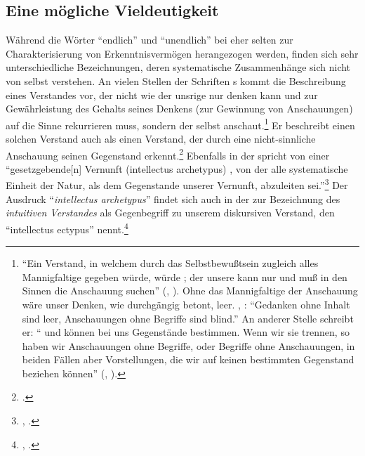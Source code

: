 \subsection{Eine mögliche
Vieldeutigkeit}\label{subsection:EineMoeglicheVieldeutigkeit}
Während die Wörter \enquote{endlich} und \enquote{unendlich} bei
 eher selten zur Charakterisierung von Erkenntnisvermögen
herangezogen werden, finden sich sehr unterschiedliche Bezeichnungen, deren
systematische Zusammenhänge sich nicht von selbst verstehen. An vielen Stellen
der Schriften s kommt die Beschreibung eines Verstandes
vor, der nicht wie der unsrige nur denken kann und zur Gewährleistung des
Gehalts seines Denkens (zur Gewinnung von Anschauungen) auf die Sinne
rekurrieren muss, sondern der selbst anschaut.\footnote{\enquote{Ein Verstand,
in welchem durch das Selbstbewußtsein zugleich alles Mannigfaltige gegeben
würde, würde ; der unsere kann nur  und muß in den
Sinnen die Anschauung suchen} \mkbibparens{\cite[][B
135]{Kant:KritikderreinenVernunft2003}, \cite[][III:
110.26--29]{Kant:GesammelteWerke1900ff.}}. Ohne das Mannigfaltige der Anschauung
wäre unser Denken, wie  durchgängig betont, leer.
\cite[Siehe z.\,B. den bekannten Ausspruch in][B
75]{Kant:KritikderreinenVernunft2003}, \cite[][III: 75.14--15]{Kant:GesammelteWerke1900ff.}:
\enquote{Gedanken ohne Inhalt sind leer, Anschauungen ohne Begriffe sind
blind.} An anderer Stelle schreibt er: \enquote{ und
 können bei uns  Gegenstände
bestimmen. Wenn wir sie trennen, so haben wir Anschauungen ohne Begriffe, oder
Begriffe ohne Anschauungen, in beiden Fällen aber Vorstellungen, die wir auf
keinen bestimmten Gegenstand beziehen können}
\mkbibparens{\cite[][B 314]{Kant:KritikderreinenVernunft2003},
\cite[][III: 213.32--36]{Kant:GesammelteWerke1900ff.}}.} Er beschreibt einen
solchen Verstand auch als einen Verstand, der durch eine nicht-sinnliche
Anschauung seinen Gegenstand  erkennt.\footnote{\cite[][B
311\,f.,]{Kant:KritikderreinenVernunft2003} \cite[][III:
212.16--21]{Kant:GesammelteWerke1900ff.}.} Ebenfalls in der  spricht  von einer
\enquote{gesetzgebende[n] Vernunft (intellectus archetypus) {\punkt}, von der
alle systematische Einheit der Natur, als dem Gegenstande unserer Vernunft,
abzuleiten sei.}\footnote{\cite[][B 723]{Kant:KritikderreinenVernunft2003},
\cite[][III: 456.37--457.2]{Kant:GesammelteWerke1900ff.}.} Der Ausdruck
\enquote{\emph{intellectus archetypus}} findet sich auch in der  zur Bezeichnung des \emph{intuitiven Verstandes} als
Gegenbegriff zu unserem diskursiven Verstand, den 
\enquote{intellectus ectypus}
nennt.\footnote{\cite[Vgl.][\S~77]{Kant:KritikderUrteilskraft2009},
\cite[][V: 408.18--23]{Kant:GesammelteWerke1900ff.}.}


